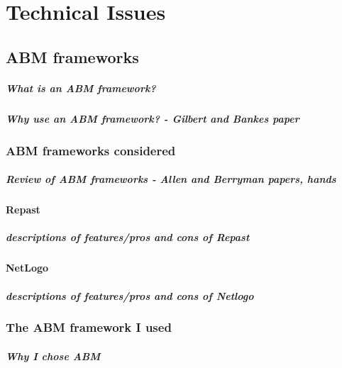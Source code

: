 \chapter{Technical Issues}\label{chapter:technicalissues}
  \section{ABM frameworks}
    \paragraph{What is an ABM framework?}
    \paragraph{Why use an ABM framework? - Gilbert and Bankes paper}
    
    \subsection{ABM frameworks considered}
      \paragraph{Review of ABM frameworks - Allen and Berryman papers, hands}
      \subsubsection{Repast}
        \paragraph{descriptions of features/pros and cons of Repast}
      \subsubsection{NetLogo}
        \paragraph{descriptions of features/pros and cons of Netlogo}

    \subsection{The ABM framework I used}
      \paragraph{Why I chose ABM}

